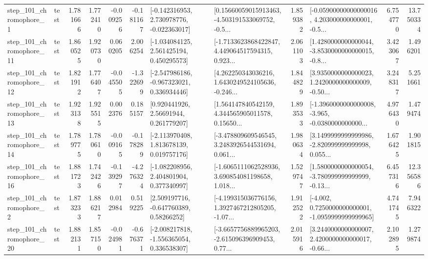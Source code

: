 \begin{tabular}{llrrrrllrlrr}
   step\_101\_chromophore\_1 &      test &      1.781666 &    1.772410 &     -0.009256 & -0.181167 &   [-0.142316953, 2.730978776, -0.022363017] &  [0.15660059015913463, -4.503191533069752, -0.5... &       1.859382 &  [-0.05900000000000016, 4.203000000000001, -0.5... &            6.754770 &         13.750334 \\
  step\_101\_chromophore\_11 &      test &      1.860525 &    1.920730 &      0.060205 &  2.006254 &    [-1.034084125, 2.561425194, 0.450295573] &  [-1.7133623868422847, 4.449064517594315, 0.923... &       2.061103 &  [1.4280000000000044, -3.8530000000000015, -0.8... &            3.423067 &          1.496201 \\
  step\_101\_chromophore\_12 &      test &      1.821912 &    1.776407 &     -0.045505 & -1.322699 &   [-2.547986186, -0.967323021, 0.336934446] &  [4.262250343036216, 1.6430249524105636, -0.246... &       1.844829 &  [3.9350000000000023, 1.2420000000000009, -0.50... &            3.248317 &          5.251661 \\
  step\_101\_chromophore\_13 &      test &      1.923138 &    1.925515 &      0.002376 &  0.185157 &      [0.920441926, 2.56691944, 0.261779207] &  [1.564147840542159, 4.344565905011578, 0.15650... &       1.893533 &  [-1.3960000000000008, -3.965, -0.0380000000000... &            4.976430 &          1.479474 \\
  step\_101\_chromophore\_14 &      test &      1.789775 &    1.780610 &     -0.009165 & -0.178289 &    [-2.113970408, 1.813678139, 0.019757176] &  [-3.478809609546545, 3.2483926544531694, 0.061... &       1.980634 &  [3.1499999999999986, -2.820999999999998, 0.055... &            1.676425 &          1.901815 \\
  step\_101\_chromophore\_16 &      test &      1.881723 &    1.742426 &     -0.139297 & -4.276324 &    [-1.082208956, 2.404801904, 0.377340997] &  [-1.6065111062528936, 3.690854081198658, 1.018... &       1.529747 &  [1.5800000000000054, -3.780999999999999, -0.13... &            6.457316 &         12.356586 \\
   step\_101\_chromophore\_2 &      test &      1.873233 &    1.886217 &      0.012984 &  0.519225 &     [2.509197716, -0.647760389, 0.58266252] &  [-4.199315036776156, 1.3927467212805205, -1.07... &       1.912522 &  [-4.002, 0.7250000000000001, -1.0959999999999965] &            4.741745 &          7.946322 \\
  step\_101\_chromophore\_20 &      test &      1.882131 &    1.857150 &     -0.024981 & -0.676371 &   [-2.008217818, -1.556365054, 0.336538307] &  [-3.6657756889965203, -2.615096396909453, 0.77... &       2.015916 &  [3.2440000000000007, 2.4200000000000017, -0.66... &            2.102895 &          1.279874 \\

\end{tabular}
